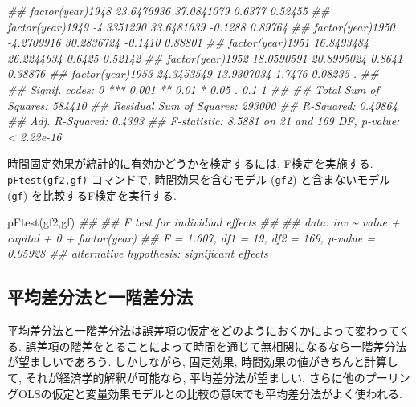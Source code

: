 \documentclass[
  letterpaper,
  xelatex,
  ja=standard, xelatex]{bxjsbook}
\newenvironment{Shaded}{\begin{snugshade}}{\end{snugshade}}
\newcommand{\DocumentationTok}[1]{\textcolor[rgb]{0.37,0.37,0.37}{\textit{#1}}}
\newcommand{\FunctionTok}[1]{\textcolor[rgb]{0.28,0.35,0.67}{#1}}
\newcommand{\NormalTok}[1]{\textcolor[rgb]{0.00,0.23,0.31}{#1}}
\begin{document}
\begin{Shaded}
\begin{Highlighting}[]
\DocumentationTok{\#\# factor(year)1948 23.6476936 37.0841079  0.6377   0.52455    }
\DocumentationTok{\#\# factor(year)1949 {-}4.3351290 33.6481639 {-}0.1288   0.89764    }
\DocumentationTok{\#\# factor(year)1950 {-}4.2709916 30.2836724 {-}0.1410   0.88801    }
\DocumentationTok{\#\# factor(year)1951 16.8493484 26.2244634  0.6425   0.52142    }
\DocumentationTok{\#\# factor(year)1952 18.0590591 20.8995024  0.8641   0.38876    }
\DocumentationTok{\#\# factor(year)1953 24.3453549 13.9307034  1.7476   0.08235 .  }
\DocumentationTok{\#\# {-}{-}{-}}
\DocumentationTok{\#\# Signif. codes:  0 \textquotesingle{}***\textquotesingle{} 0.001 \textquotesingle{}**\textquotesingle{} 0.01 \textquotesingle{}*\textquotesingle{} 0.05 \textquotesingle{}.\textquotesingle{} 0.1 \textquotesingle{} \textquotesingle{} 1}
\DocumentationTok{\#\# }
\DocumentationTok{\#\# Total Sum of Squares:    584410}
\DocumentationTok{\#\# Residual Sum of Squares: 293000}
\DocumentationTok{\#\# R{-}Squared:      0.49864}
\DocumentationTok{\#\# Adj. R{-}Squared: 0.4393}
\DocumentationTok{\#\# F{-}statistic: 8.5881 on 21 and 169 DF, p{-}value: \textless{} 2.22e{-}16}
\end{Highlighting}
\end{Shaded}

時間固定効果が統計的に有効かどうかを検定するには, F検定を実施する.
\texttt{pFtest(gf2,gf)} コマンドで, 時間効果を含むモデル (\texttt{gf2})
と含まないモデル (\texttt{gf}) を比較するF検定を実行する.

\begin{Shaded}
\begin{Highlighting}[]
\FunctionTok{pFtest}\NormalTok{(gf2,gf)}
\DocumentationTok{\#\# }
\DocumentationTok{\#\#  F test for individual effects}
\DocumentationTok{\#\# }
\DocumentationTok{\#\# data:  inv \textasciitilde{} value + capital + 0 + factor(year)}
\DocumentationTok{\#\# F = 1.607, df1 = 19, df2 = 169, p{-}value = 0.05928}
\DocumentationTok{\#\# alternative hypothesis: significant effects}
\end{Highlighting}
\end{Shaded}

\subsection{平均差分法と一階差分法}\label{ux5e73ux5747ux5deeux5206ux6cd5ux3068ux4e00ux968eux5deeux5206ux6cd5}

平均差分法と一階差分法は誤差項の仮定をどのようにおくかによって変わってくる.
誤差項の階差をとることによって時間を通じて無相関になるなら一階差分法が望ましいであろう.
しかしながら, 固定効果, 時間効果の値がきちんと計算して,
それが経済学的解釈が可能なら, 平均差分法が望ましい.
さらに他のプーリングOLSの仮定と変量効果モデルとの比較の意味でも平均差分法がよく使われる.
\end{document}
